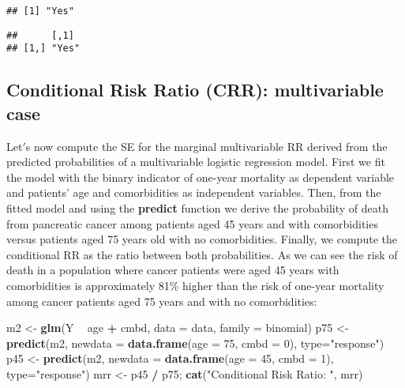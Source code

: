 \documentclass[
]{article}
\newenvironment{Shaded}{\begin{snugshade}}{\end{snugshade}}
\newcommand{\DataTypeTok}[1]{\textcolor[rgb]{0.13,0.29,0.53}{#1}}
\newcommand{\DecValTok}[1]{\textcolor[rgb]{0.00,0.00,0.81}{#1}}
\newcommand{\KeywordTok}[1]{\textcolor[rgb]{0.13,0.29,0.53}{\textbf{#1}}}
\newcommand{\NormalTok}[1]{#1}
\newcommand{\OperatorTok}[1]{\textcolor[rgb]{0.81,0.36,0.00}{\textbf{#1}}}
\newcommand{\StringTok}[1]{\textcolor[rgb]{0.31,0.60,0.02}{#1}}
\begin{document}
\begin{verbatim}
## [1] "Yes"
\end{verbatim}

\begin{verbatim}
##      [,1] 
## [1,] "Yes"
\end{verbatim}

\hypertarget{conditional-risk-ratio-crr-multivariable-case}{%
\subsection{Conditional Risk Ratio (CRR): multivariable
case}\label{conditional-risk-ratio-crr-multivariable-case}}

Let\('\)s now compute the SE for the marginal multivariable RR derived
from the predicted probabilities of a multivariable logistic regression
model. First we fit the model with the binary indicator of one-year
mortality as dependent variable and patients\(’\) age and comorbidities
as independent variables. Then, from the fitted model and using the
\textbf{predict} function we derive the probability of death from
pancreatic cancer among patients aged 45 years and with comorbidities
versus patients aged 75 years old with no comorbidities. Finally, we
compute the conditional RR as the ratio between both probabilities. As
we can see the risk of death in a population where cancer patients were
aged 45 years with comorbidities is approximately 81\% higher than the
risk of one-year mortality among cancer patients aged 75 years and with
no comorbidities:

\begin{Shaded}
\begin{Highlighting}[]
\NormalTok{m2 <-}\StringTok{ }\KeywordTok{glm}\NormalTok{(Y }\OperatorTok{~}\StringTok{ }\NormalTok{age }\OperatorTok{+}\StringTok{ }\NormalTok{cmbd, }\DataTypeTok{data =}\NormalTok{ data, }\DataTypeTok{family =}\NormalTok{ binomial)}
\NormalTok{p75 <-}\StringTok{ }\KeywordTok{predict}\NormalTok{(m2, }\DataTypeTok{newdata =} \KeywordTok{data.frame}\NormalTok{(}\DataTypeTok{age =} \DecValTok{75}\NormalTok{, }\DataTypeTok{cmbd =} \DecValTok{0}\NormalTok{), }\DataTypeTok{type=}\StringTok{"response"}\NormalTok{)}
\NormalTok{p45 <-}\StringTok{ }\KeywordTok{predict}\NormalTok{(m2, }\DataTypeTok{newdata =} \KeywordTok{data.frame}\NormalTok{(}\DataTypeTok{age =} \DecValTok{45}\NormalTok{, }\DataTypeTok{cmbd =} \DecValTok{1}\NormalTok{), }\DataTypeTok{type=}\StringTok{"response"}\NormalTok{)}
\NormalTok{mrr <-}\StringTok{ }\NormalTok{p45 }\OperatorTok{/}\StringTok{ }\NormalTok{p75;}
\KeywordTok{cat}\NormalTok{(}\StringTok{"Conditional Risk Ratio: "}\NormalTok{, mrr)}
\end{Highlighting}
\end{Shaded}
\end{document}
